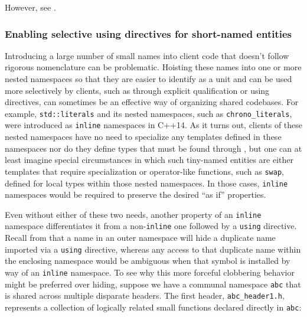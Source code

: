 \noindent However, see . 

\subsubsection[Enabling selective \lstinline!using! directives for short-named entities]{Enabling selective {\SubsubsecCode using} directives for short-named entities}\label{enabling-selective-using-directives-for-short-named-entities}

Introducing a large number of small names into client code that doesn't
follow rigorous nomenclature can be problematic. Hoisting these names
into one or more nested namespaces so that they are easier to identify
as a unit and can be used more selectively by clients, such as through
explicit qualification or using directives, can sometimes be an
effective way of organizing shared codebases. For example,
\lstinline!std::literals! and its nested namespaces, such as
\lstinline!chrono_literals!, were introduced as \lstinline!inline! namespaces
in C++14. As it turns out, clients of these nested namespaces have no
need to specialize any templates defined in these namespaces nor do they
define types that must be found through , but one can at
least imagine special circumstances in which such tiny-named entities
are either templates that require specialization or operator-like
functions, such as \lstinline!swap!, defined for local types within those
nested namespaces. In those cases, \lstinline!inline! namespaces would be
required to preserve the desired ``as if'' properties.

Even without either of these two needs, another property of an
\lstinline!inline! namespace differentiates it from a non-\lstinline!inline!
one followed by a \lstinline!using! directive. Recall from  
that a name in an outer namespace will
hide a duplicate name imported via a \lstinline!using! directive, whereas
any access to that duplicate name within the enclosing namespace would
be ambiguous when that symbol is installed by way of an \lstinline!inline!
namespace. To see why this more forceful clobbering behavior might be
preferred over hiding, suppose we have a communal namespace \lstinline!abc!
that is shared across multiple disparate headers. The first header,
\lstinline!abc_header1.h!, represents a collection of logically related
small functions declared directly in \lstinline!abc!:

